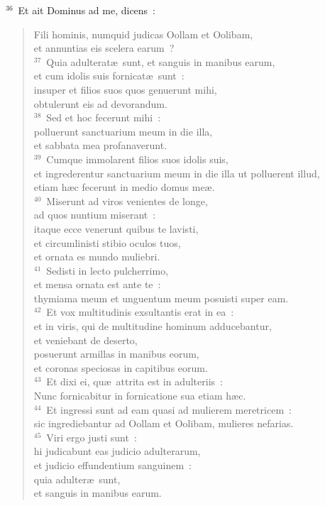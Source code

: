 ${}^{36}$~Et ait Dominus ad me, dicens~: \begin{verse}Fili hominis, numquid judicas Oollam et Oolibam,\\ et annuntias eis scelera earum~?\\
${}^{37}$~Quia adulterat\ae\ sunt, et sanguis in manibus earum,\\ et cum idolis suis fornicat\ae\ sunt~:\\ insuper et filios suos quos genuerunt mihi,\\ obtulerunt eis ad devorandum.\\
${}^{38}$~Sed et hoc fecerunt mihi~:\\ polluerunt sanctuarium meum in die illa,\\ et sabbata mea profanaverunt.\\
${}^{39}$~Cumque immolarent filios suos idolis suis,\\ et ingrederentur sanctuarium meum in die illa ut polluerent illud,\\ etiam h\ae c fecerunt in medio domus me\ae .\\
${}^{40}$~Miserunt ad viros venientes de longe,\\ ad quos nuntium miserant~:\\ itaque ecce venerunt quibus te lavisti,\\ et circumlinisti stibio oculos tuos,\\ et ornata es mundo muliebri.\\
${}^{41}$~Sedisti in lecto pulcherrimo,\\ et mensa ornata est ante te~:\\ thymiama meum et unguentum meum posuisti super eam.\\
${}^{42}$~Et vox multitudinis exsultantis erat in ea~:\\ et in viris, qui de multitudine hominum adducebantur,\\ et veniebant de deserto,\\ posuerunt armillas in manibus eorum,\\ et coronas speciosas in capitibus eorum.\\
${}^{43}$~Et dixi ei, qu\ae\ attrita est in adulteriis~:\\ Nunc fornicabitur in fornicatione sua etiam h\ae c.\\
${}^{44}$~Et ingressi sunt ad eam quasi ad mulierem meretricem~:\\ sic ingrediebantur ad Oollam et Oolibam, mulieres nefarias.\\
${}^{45}$~Viri ergo justi sunt~:\\ hi judicabunt eas judicio adulterarum,\\ et judicio effundentium sanguinem~:\\ quia adulter\ae\ sunt,\\ et sanguis in manibus earum.\\

\end{verse}
